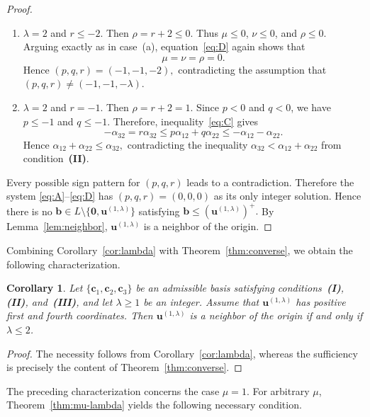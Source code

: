 \documentclass[12pt,a4paper]{amsart}
\newtheorem{corollary}[theorem]{Corollary}
\theoremstyle{definition}
\begin{document}
\begin{proof}
\begin{enumerate}
\begin{enumerate}
\item[(b)] $\lambda=2$ and $r\le-2$. Then $\rho=r+2\le0.$ Thus
$\mu\le0$, $\nu\le0$, and $\rho\le0$. Arguing exactly as in
case~\textup{(a)}, equation~\eqref{eq:D} again shows that
\[
\mu=\nu=\rho=0.
\]
Hence
$
(p,q,r)=(-1,-1,-2),$
contradicting the assumption that
$
(p,q,r)\neq(-1,-1,-\lambda).$

\item[(c)] $\lambda=2$ and $r=-1$. Then $\rho=r+2=1$. Since $p<0$ and $q<0$, we have
$p\le-1$ and $q\le-1$. Therefore, inequality~\eqref{eq:C} gives
\[
-\alpha_{32}
=
r\alpha_{32}
\le
p\alpha_{12}+q\alpha_{22}
\le
-\alpha_{12}-\alpha_{22}.
\]
Hence
$
\alpha_{12}+\alpha_{22}\le\alpha_{32},$
contradicting the inequality
$
\alpha_{32}<\alpha_{12}+\alpha_{22}$
from condition~\textup{\textbf{(II)}}.
\end{enumerate}
\end{enumerate}

Every possible sign pattern for $(p,q,r)$ leads to a contradiction.
Therefore the system
\eqref{eq:A}--\eqref{eq:D}
has $(p,q,r)=(0,0,0)$ as its only integer solution.
Hence there is no
$
\mathbf b\in
L\setminus
\{\mathbf0,\mathbf u^{(1,\lambda)}\}$
satisfying
$
\mathbf b\le
(\mathbf u^{(1,\lambda)})^+.$
By Lemma~\ref{lem:neighbor},
$\mathbf u^{(1,\lambda)}$
is a neighbor of the origin.
\end{proof}

Combining Corollary~\ref{cor:lambda} with
Theorem~\ref{thm:converse}, we obtain the following characterization.


\begin{corollary}\label{cor:iff}
Let $\{\mathbf c_1,\mathbf c_2,\mathbf c_3\}$ be an admissible basis
satisfying conditions~\textup{\textbf{(I)}},
\textup{\textbf{(II)}}, and~\textup{\textbf{(III)}},
and let $\lambda\ge1$ be an integer.
Assume that $\mathbf u^{(1,\lambda)}$ has positive first and fourth
coordinates. Then $\mathbf u^{(1,\lambda)}$ is a neighbor of the origin
if and only if $\lambda\le2$.
\end{corollary}

\begin{proof}
The necessity follows from Corollary~\ref{cor:lambda}, whereas the
sufficiency is precisely the content of
Theorem~\ref{thm:converse}.
\end{proof}

The preceding characterization concerns the case $\mu=1$.
For arbitrary $\mu$, Theorem~\ref{thm:mu-lambda} yields the following
necessary condition.
\end{document}

